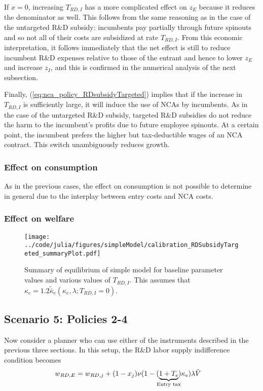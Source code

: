 \documentclass[11pt,english]{article}
\theoremstyle{remark}
\begin{document}
If $x = 0$, increasing $T_{RD,I}$ has a more complicated effect on $z_E$ because it reduces the denominator as well. This follows from the same reasoning as in the case of the untargeted R\&D subsidy: incumbents pay partially through future spinouts and so not all of their costs are subsidized at rate $T_{RD,I}$. From this economic interpretation, it follows immediately that the net effect is still to reduce incumbent R\&D expenses relative to those of the entrant and hence to lower $z_E$ and increase $z_I$, and this is confirmed in the numerical analysis of the next subsection.

Finally, (\ref{eq:nca_policy_RDsubsidyTargeted}) implies that if the increase in $T_{RD,I}$ is sufficiently large, it will induce the use of NCAs by incumbents. As in the case of the untargeted R\&D subsidy, targeted R\&D subsidies do not reduce the harm to the incumbent's profits due to future employee spinouts. At a certain point, the incumbent prefers the higher but tax-deductible wages of an NCA contract. This switch unambiguously reduces growth.

\subsubsection{Effect on consumption}

As in the previous cases, the effect on consumption is not possible to determine in general due to the interplay between entry costs and NCA costs. 

\subsubsection{Effect on welfare}

\begin{figure}[]
	\texttt{[image: ../code/julia/figures/simpleModel/calibration\_RDSubsidyTargeted\_summaryPlot.pdf]}
	\caption{Summary of equilibrium of simple model for baseline parameter values and various values of $T_{RD,I}$. This assumes that $\kappa_c = 1.2 \tilde{\bar{\kappa}}_c(\kappa_e,\lambda;T_{RD,I} = 0)$.}
	\label{calibration_RDSubsidyTargeted_summaryPlot}
\end{figure}


\subsection{Scenario 5: Policies 2-4}

Now consider a planner who can use either of the instruments described in the previous three sections. In this setup, the R\&D labor supply indifference condition becomes
\begin{align}
w_{RD,E} &= w_{RD,j} + (1-x_j) \nu (1-(\underbrace{1+T_e}_{\mathclap{\text{Entry tax}}})\kappa_e) \lambda \tilde{V} \label{eq:RD_worker_indifference_all}
\end{align}
\end{document}
